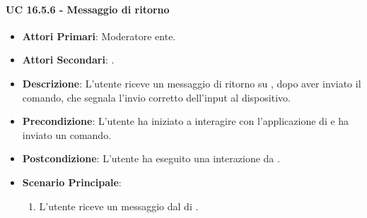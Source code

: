 		\paragraph{UC 16.5.6 - Messaggio di ritorno }
		\begin{itemize}
			\item \textbf{Attori Primari}: Moderatore ente.
			\item \textbf{Attori Secondari}: .
			\item \textbf{Descrizione}: L'utente riceve un messaggio di ritorno su , dopo aver inviato il comando, che segnala l'invio corretto dell'input al dispositivo. 
			\item \textbf{Precondizione}: L'utente ha iniziato a interagire con l'applicazione di  e ha inviato un comando.
			\item \textbf{Postcondizione}: L'utente ha eseguito una interazione da .
			\item \textbf{Scenario Principale}:
			\begin{enumerate}
				\item L'utente riceve un messaggio dal  di .
			\end{enumerate}
		\end{itemize}	

		




